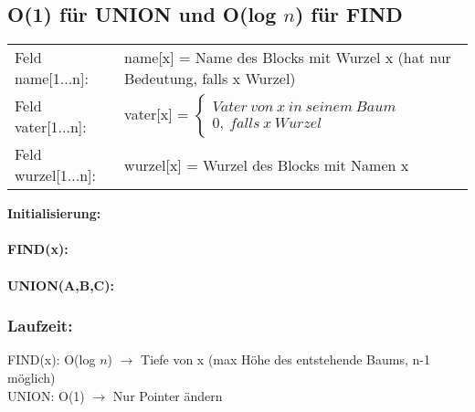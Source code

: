 \documentclass[10pt,a4paper]{article}
\begin{document}
\subsection*{O(1) für UNION und O(log $n$) für FIND}
\begin{tabular}{ll}
     Feld name[1...n]:& name[x] = Name des Blocks mit Wurzel x (hat nur Bedeutung, falls x Wurzel) \\
     Feld vater[1...n]:& vater[x] = $\begin{cases}
    Vater\ von\ x\ in\ seinem\ Baum\\
    0,\ falls\ x\ Wurzel
  \end{cases}$ \\
     Feld wurzel[1...n]:& wurzel[x] = Wurzel des Blocks mit Namen x \\
\end{tabular}
\begin{algorithm}[H]
	\textbf{Initialisierung:}	\\
	~\\
	\textbf{FIND(x):} \\
	~\\
	
	\textbf{UNION(A,B,C):} \\
	
\end{algorithm}

\subsubsection*{Laufzeit:}
FIND(x): O(log $n$) $\rightarrow$ Tiefe von x (max Höhe des entstehende Baums, n-1 möglich)\\ 
UNION: O(1) $\rightarrow$ Nur Pointer ändern
\end{document}
